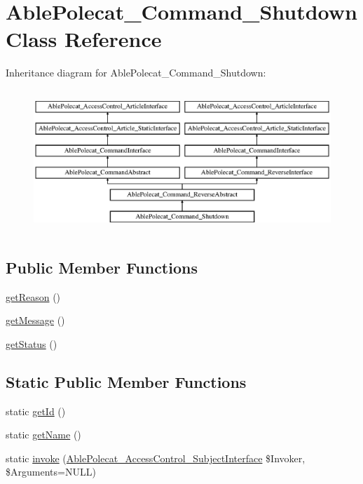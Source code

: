 \hypertarget{class_able_polecat___command___shutdown}{}\section{Able\+Polecat\+\_\+\+Command\+\_\+\+Shutdown Class Reference}
\label{class_able_polecat___command___shutdown}
Inheritance diagram for Able\+Polecat\+\_\+\+Command\+\_\+\+Shutdown\+:\begin{figure}[H]
\begin{center}
\leavevmode
\includegraphics[height=5.419355cm]{class_able_polecat___command___shutdown}
\end{center}
\end{figure}
\subsection*{Public Member Functions}
\begin{DoxyCompactItemize}
\item 
\hyperlink{class_able_polecat___command___shutdown_ac0d1221a542d8f0d74963600876c4b52}{get\+Reason} ()
\item 
\hyperlink{class_able_polecat___command___shutdown_a0b0e611236742aac18ba1936d03ba89a}{get\+Message} ()
\item 
\hyperlink{class_able_polecat___command___shutdown_a9d21636071f529e2154051d3ea6e5921}{get\+Status} ()
\end{DoxyCompactItemize}
\subsection*{Static Public Member Functions}
\begin{DoxyCompactItemize}
\item 
static \hyperlink{class_able_polecat___command___shutdown_acfaa3a96d0cb5a4c0d4d710dcba41e9e}{get\+Id} ()
\item 
static \hyperlink{class_able_polecat___command___shutdown_a4ef9bd37ba3ce8a13c1e8bcf4f72a630}{get\+Name} ()
\item 
static \hyperlink{class_able_polecat___command___shutdown_a6821480fe527af0afdf3691d7cffad5f}{invoke} (\hyperlink{interface_able_polecat___access_control___subject_interface}{Able\+Polecat\+\_\+\+Access\+Control\+\_\+\+Subject\+Interface} \$Invoker, \$Arguments=N\+U\+L\+L)
\end{DoxyCompactItemize}
